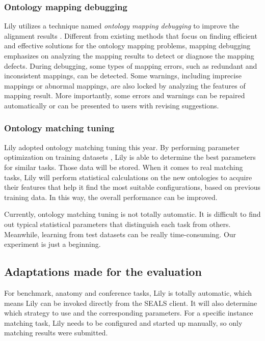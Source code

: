 \documentclass{llncs}
\begin{document}
\subsubsection{Ontology mapping debugging} Lily utilizes a technique named \textit{ontology mapping debugging} to improve the alignment results \cite{om_dbg}. Different from existing methods that focus on finding efficient and effective solutions for the ontology mapping problems, mapping debugging emphasizes on analyzing the mapping results to detect or diagnose the mapping defects. During debugging, some types of mapping errors, such as redundant and inconsistent mappings, can be detected. Some warnings, including imprecise mappings or abnormal mappings, are also locked by analyzing the features of mapping result. More importantly, some errors and warnings can be repaired automatically or can be presented to users with revising suggestions. \par
\subsubsection{Ontology matching tuning} Lily adopted ontology matching tuning this year. By performing parameter optimization on training datasets \cite{param_tuning}, Lily is able to determine the best parameters for similar tasks. Those data will be stored. When it comes to real matching tasks, Lily will perform statistical calculations on the new ontologies to acquire their features that help it find the most suitable configurations, based on previous training data. In this way, the overall performance can be improved. \par
Currently, ontology matching tuning is not totally automatic. It is difficult to find out typical statistical parameters that distinguish each task from others. Meanwhile, learning from test datasets can be really time-consuming. Our experiment is just a beginning. \par

\subsection{Adaptations made for the evaluation}
For benchmark, anatomy and conference tasks, Lily is totally automatic, which means Lily can be invoked directly from the SEALS client. It will also determine which strategy to use and the corresponding parameters. For a specific instance matching task, Lily needs to be configured and started up manually, so only matching results were submitted. \par
\end{document}
